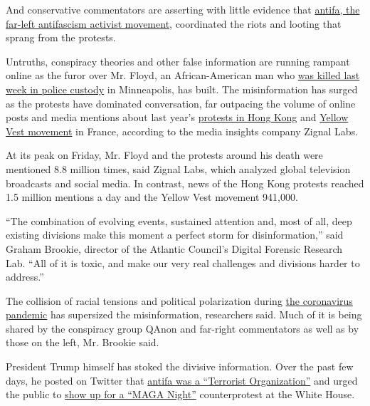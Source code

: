 And conservative commentators are asserting with little evidence that
\href{https://www.nytimes3xbfgragh.onion/article/what-antifa-trump.html}{antifa,
the far-left antifascism activist movement}, coordinated the riots and
looting that sprang from the protests.

Untruths, conspiracy theories and other false information are running
rampant online as the furor over Mr. Floyd, an African-American man who
\href{https://www.nytimes3xbfgragh.onion/2020/05/31/us/george-floyd-investigation.html}{was
killed last week in police custody} in Minneapolis, has built. The
misinformation has surged as the protests have dominated conversation,
far outpacing the volume of online posts and media mentions about last
year's
\href{https://www.nytimes3xbfgragh.onion/news-event/hong-kong-protests}{protests
in Hong Kong} and
\href{https://www.nytimes3xbfgragh.onion/2019/04/15/business/yellow-vests-movement-inequality.html}{Yellow
Vest movement} in France, according to the media insights company Zignal
Labs.

At its peak on Friday, Mr. Floyd and the protests around his death were
mentioned 8.8 million times, said Zignal Labs, which analyzed global
television broadcasts and social media. In contrast, news of the Hong
Kong protests reached 1.5 million mentions a day and the Yellow Vest
movement 941,000.

``The combination of evolving events, sustained attention and, most of
all, deep existing divisions make this moment a perfect storm for
disinformation,'' said Graham Brookie, director of the Atlantic
Council's Digital Forensic Research Lab. ``All of it is toxic, and make
our very real challenges and divisions harder to address.''

The collision of racial tensions and political polarization during
\href{https://www.nytimes3xbfgragh.onion/news-event/coronavirus?action=click\&pgtype=Article\&state=default\&module=styln-coronavirus\&variant=show\&region=TOP_BANNER\&context=storylines_menu}{the
coronavirus pandemic} has supersized the misinformation, researchers
said. Much of it is being shared by the conspiracy group QAnon and
far-right commentators as well as by those on the left, Mr. Brookie
said.

President Trump himself has stoked the divisive information. Over the
past few days, he posted on Twitter that
\href{https://www.nytimes3xbfgragh.onion/reuters/2020/05/31/us/31reuters-minneapolis-police-trump-antifa.html}{antifa
was a ``Terrorist Organization''} and urged the public to
\href{https://www.nytimes3xbfgragh.onion/2020/05/30/us/politics/trump-threatens-protesters-dogs-weapons.html}{show
up for a ``MAGA Night''} counterprotest at the White House.

